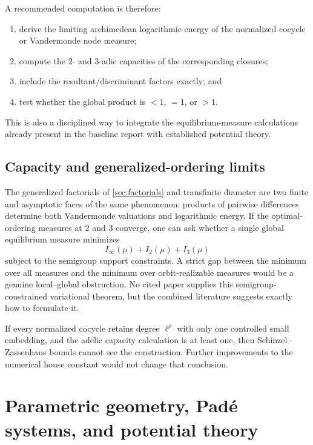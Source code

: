 \documentclass[10pt,letterpaper]{article}
\begin{document}
A recommended computation is therefore:

\begin{enumerate}
\item derive the limiting archimedean logarithmic energy of the normalized cocycle or
Vandermonde node measure;
\item compute the \(2\)- and \(3\)-adic capacities of the corresponding closures;
\item include the resultant/discriminant factors exactly; and
\item test whether the global product is \(<1\), \(=1\), or \(>1\).
\end{enumerate}

This is also a disciplined way to integrate the equilibrium-measure calculations already
present in the baseline report with established potential theory.

\subsection{Capacity and generalized-ordering limits}

The generalized factorials of \cref{sec:factorials} and transfinite diameter are two finite
and asymptotic faces of the same phenomenon: products of pairwise differences determine both
Vandermonde valuations and logarithmic energy.  If the optimal-ordering measures at \(2\)
and \(3\) converge, one can ask whether a single global equilibrium measure minimizes
\[
  I_\infty(\mu)+I_2(\mu)+I_3(\mu)
\]
subject to the semigroup support constraints.  A strict gap between the minimum over all
measures and the minimum over orbit-realizable measures would be a genuine local--global
obstruction.  No cited paper supplies this semigroup-constrained variational theorem, but the
combined literature suggests exactly how to formulate it.

\begin{stopbox}
If every normalized cocycle retains degree \(\ell^\rho\) with only one controlled small
embedding, and the adelic capacity calculation is at least one, then Schinzel--Zassenhaus
bounds cannot see the construction.  Further improvements to the numerical house constant
would not change that conclusion.
\end{stopbox}

\section{Parametric geometry, Pad\'e systems, and potential theory}
\label{sec:pade}
\end{document}
